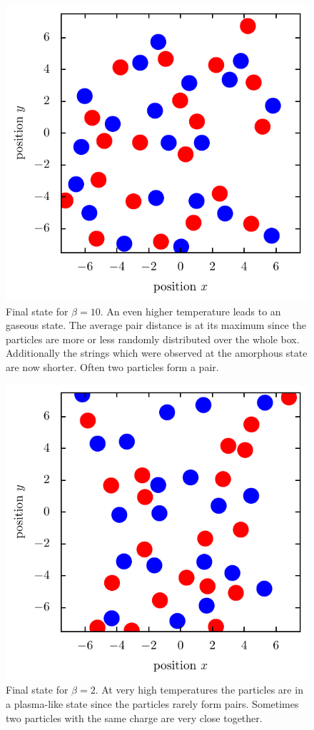 \documentclass[11pt, a4paper]{article}
\numberwithin{equation}{section}
\begin{document}
\begin{figure}[!h]
\centering
\includegraphics[scale=1]{figures/Gas_1_beta_10.pdf}
\caption{Final state for $\beta = 10$.
An even higher temperature leads to an gaseous state.
The average pair distance is at its maximum since the particles are more or less randomly distributed over the whole box.
Additionally the strings which were observed at the amorphous state are now shorter.
Often two particles form a pair.}
\end{figure}


\begin{figure}[!h]
\centering
\includegraphics[scale=1]{figures/Plasma_1_beta_2.pdf}
\caption{Final state for $\beta = 2$.
At very high temperatures the particles are in a plasma-like state since the particles rarely form pairs.
Sometimes two particles with the same charge are very close together.}
\end{figure}
\end{document}
